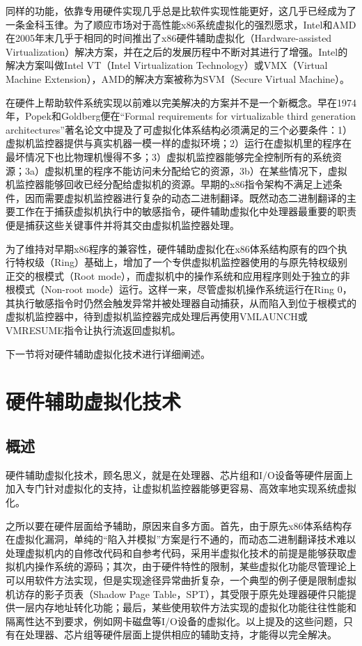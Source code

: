 同样的功能，依靠专用硬件实现几乎总是比软件实现性能更好，这几乎已经成为了一条金科玉律。为了顺应市场对于高性能x86系统虚拟化的强烈愿求，Intel和AMD在2005年末几乎于相同的时间推出了x86硬件辅助虚拟化（Hardware-assisted Virtualization）解决方案，并在之后的发展历程中不断对其进行了增强。Intel的解决方案叫做Intel VT（Intel Virtualization Technology）或VMX（Virtual Machine Extension），AMD的解决方案被称为SVM（Secure Virtual Machine）。

在硬件上帮助软件系统实现以前难以完美解决的方案并不是一个新概念。早在1974年，Popek和Goldberg便在``Formal requirements for virtualizable third generation architectures''著名论文中提及了可虚拟化体系结构必须满足的三个必要条件：1）虚拟机监控器提供与真实机器一模一样的虚拟环境；2）运行在虚拟机里的程序在最坏情况下也比物理机慢得不多；3）虚拟机监控器能够完全控制所有的系统资源；3a）虚拟机里的程序不能访问未分配给它的资源，3b）在某些情况下，虚拟机监控器能够回收已经分配给虚拟机的资源。早期的x86指令架构不满足上述条件，因而需要虚拟机监控器进行复杂的动态二进制翻译。既然动态二进制翻译的主要工作在于捕获虚拟机执行中的敏感指令，硬件辅助虚拟化中处理器最重要的职责便是捕获这些关键事件并将其交由虚拟机监控器处理。

为了维持对早期x86程序的兼容性，硬件辅助虚拟化在x86体系结构原有的四个执行特权级（Ring）基础上，增加了一个专供虚拟机监控器使用的与原先特权级别正交的根模式（Root mode），而虚拟机中的操作系统和应用程序则处于独立的非根模式（Non-root mode）运行。这样一来，尽管虚拟机操作系统运行在Ring 0，其执行敏感指令时仍然会触发异常并被处理器自动捕获，从而陷入到位于根模式的虚拟机监控器中，待到虚拟机监控器完成处理后再使用VMLAUNCH或VMRESUME指令让执行流返回虚拟机。

下一节将对硬件辅助虚拟化技术进行详细阐述。

\section{硬件辅助虚拟化技术}

\subsection{概述}

硬件辅助虚拟化技术，顾名思义，就是在处理器、芯片组和I/O设备等硬件层面上加入专门针对虚拟化的支持，让虚拟机监控器能够更容易、高效率地实现系统虚拟化。

之所以要在硬件层面给予辅助，原因来自多方面。首先，由于原先x86体系结构存在虚拟化漏洞，单纯的``陷入并模拟''方案是行不通的，而动态二进制翻译技术难以处理虚拟机内的自修改代码和自参考代码，采用半虚拟化技术的前提是能够获取虚拟机内操作系统的源码；其次，由于硬件特性的限制，某些虚拟化功能尽管理论上可以用软件方法实现，但是实现途径异常曲折复杂，一个典型的例子便是限制虚拟机访存的影子页表（Shadow Page Table，SPT），其受限于原先处理器硬件只能提供一层内存地址转化功能；最后，某些使用软件方法实现的虚拟化功能往往性能和隔离性达不到要求，例如网卡磁盘等I/O设备的虚拟化。以上提及的这些问题，只有在处理器、芯片组等硬件层面上提供相应的辅助支持，才能得以完全解决。

